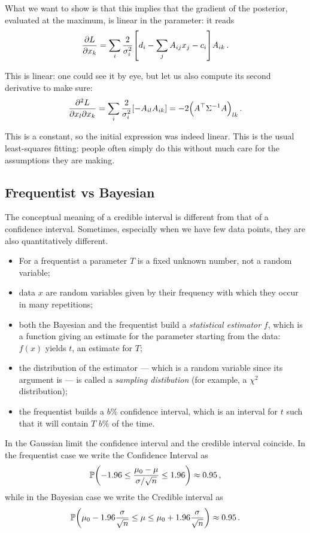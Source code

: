 \documentclass[main.tex]{subfiles}
\begin{document}
What we want to show is that this implies that the gradient of the posterior, evaluated at the maximum, is linear in the parameter: it reads 
%
\begin{align}
\pdv{L}{x_k} = \sum _{i} \frac{2}{\sigma _i^2}
\qty[ d_i - \sum _{j} A_{ij} x_j - c_i ] A_{ik}
\,.
\end{align}

This is linear: one could see it by eye, but let us also compute its second derivative to make sure: 
%
\begin{align}
\pdv[2]{L}{x_l}{x_k}
= 
\sum _{i} \frac{2}{\sigma _i^2}
\qty[- A_{il} A_{ik}] = -2 \qty( A^{\top} \Sigma^{-1} A)_{lk}
\,.
\end{align}

This is a constant, so the initial expression was indeed linear.
This is the usual least-squares fitting: people often simply do this without much care for the assumptions they are making.
 
\subsection{Frequentist vs Bayesian}

The conceptual meaning of a credible interval is different from that of a confidence interval. 
Sometimes, especially when we have few data points, they are also quantitatively different. 

\begin{itemize}
    \item For a frequentist a parameter \(T\) is a fixed unknown number, not a random variable;
    \item data \(x\) are random variables given by their frequency with which they occur in many repetitions;
    \item both the Bayesian and the frequentist build a \emph{statistical estimator} \(f\), which is a function giving an estimate for the parameter starting from the data: \(f(x)\) yields \(t\), an estimate for \(T\); 
    \item the distribution of the estimator --- which is a random variable since its argument is --- is called a \emph{sampling distibution} (for example, a \(\chi^2\) distribution);
    \item the frequentist builds a \(b \%\) confidence interval, which is an interval for \(t\) such that it will contain \(T\) \(b \%\) of the time.
\end{itemize}

In the Gaussian limit the confidence interval and the credible interval coincide. 
In the frequentist case we write the Confidence Interval as 
%
\begin{align}
\mathbb{P}\qty(-\num{1.96} 
\leq \frac{\mu_0 - \mu }{\sigma / \sqrt{n}}
\leq \num{1.96}) \approx \num{.95}
\,,
\end{align}
%
while in the Bayesian case we write the Credible interval as 
%
\begin{align}
\mathbb{P}\qty(\mu_0 - \num{1.96} \frac{\sigma }{\sqrt{n}}
\leq \mu \leq \mu_0 + \num{1.96} \frac{\sigma }{\sqrt{n}}) \approx \num{.95}
\,.
\end{align}
\end{document}
